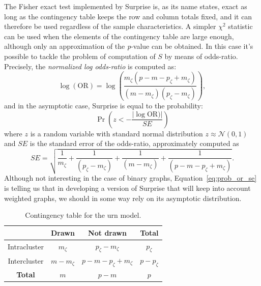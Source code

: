 The Fisher exact test implemented by Surprise is, as its name states, exact as long as the contingency table keeps the row and column totals fixed, and it can therefore be used regardless of the sample characteristics.
A simpler $\chi^2$ statistic can be used when the elements of the contingency table are large enough, although only an approximation of the \emph{p}-value can be obtained.
In this case it's possible to tackle the problem of computation of $S$ by means of odds-ratio.
Precisely, the \emph{normalized log odds-ratio} is computed as: 
\begin{equation}
\log(\textrm{OR}) = \log\left( \frac{m_\zeta(p-m-p_\zeta+m_\zeta)}{(m-m_\zeta)(p_\zeta-m_\zeta)} \right ),
\end{equation}
and in the asymptotic case, Surprise is equal to the probability:
\begin{equation}\label{eq:prob_or_se}
\Pr\left(z < -\frac{|\log\textrm{OR})|}{SE} \right)
\end{equation}
where $z$ is a random variable with standard normal distribution $z \approx \mathcal{N}(0,1)$ and $SE$ is the standard error of the odds-ratio, approximately computed as 
\begin{equation}
SE=\sqrt{\frac{1}{m_\zeta} + \frac{1}{(p_\zeta-m_\zeta)} + \frac{1}{(m-m_\zeta)} + \frac{1}{(p - m - p_\zeta + m_\zeta)}}.
\end{equation}
Although not interesting in the case of binary graphs, Equation~\ref{eq:prob_or_se} is telling us that in developing a version of Surprise that will keep into account weighted graphs, we should in some way rely on its asymptotic distribution.

\begin{table}[htb!]
\centering
\begin{tabular}{|c|c|c|c|}
\hline
 & Drawn & Not drawn & \textbf{Total}\\
\hline
Intracluster & $m_\zeta$ & $p_\zeta-m_\zeta$ & $p_\zeta$\\
\hline
Intercluster & $m-m_\zeta$ & $p-m-p_\zeta+m_\zeta$ & $p-p_\zeta$ \\
\hline
\textbf{Total} & $m$ & $p-m$ & $p$ \\
\hline
\end{tabular}
\caption{Contingency table for the urn model.}
\label{tab:contingency_table}
\end{table}

